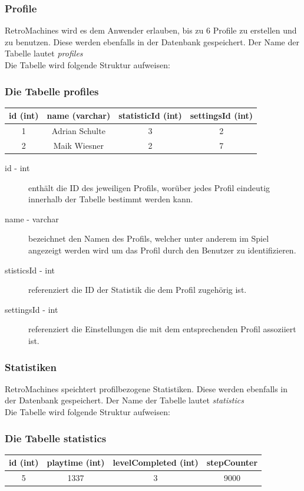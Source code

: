 \documentclass[11pt,a4paper]{report}
\begin{document}
\subsubsection{Profile}

RetroMachines wird es dem Anwender erlauben, bis zu 6 Profile zu erstellen und zu benutzen. Diese werden ebenfalls in der Datenbank gespeichert. Der Name der Tabelle lautet \textit{profiles}\\
Die Tabelle wird folgende Struktur aufweisen:

{\center
\subsubsection*{Die Tabelle profiles}
\begin{tabular}{cccc}
	\hline
	id (int) & name (varchar) & statisticId (int) & settingsId (int) \\
	\hline
	1 & Adrian Schulte & 3 & 2 \\
	2 & Maik Wiesner & 2 & 7 \\
	\hline
\end{tabular}
\par
}

\begin{description}
	\item[id - int] enthält die ID des jeweiligen Profils, worüber jedes Profil eindeutig innerhalb der Tabelle bestimmt werden kann.
	\item[name - varchar] bezeichnet den Namen des Profils, welcher unter anderem im Spiel angezeigt werden wird um das Profil durch den Benutzer zu identifizieren.
	\item[stisticsId - int] referenziert die ID der Statistik die dem Profil zugehörig ist.
	\item[settingsId - int] referenziert die Einstellungen die mit dem entsprechenden Profil assoziiert ist.
\end{description}


\subsubsection{Statistiken}

RetroMachines speichtert profilbezogene Statistiken. Diese werden ebenfalls in der Datenbank gespeichert. Der Name der Tabelle lautet \textit{statistics}\\
Die Tabelle wird folgende Struktur aufweisen:

{\center
\subsubsection*{Die Tabelle statistics}
\begin{tabular}{cccc}
	\hline
	id (int) & playtime (int) & levelCompleted (int) & stepCounter \\
	\hline
	5 & 1337 & 3 & 9000 \\
	\hline
\end{tabular}
\par
}
\end{document}
